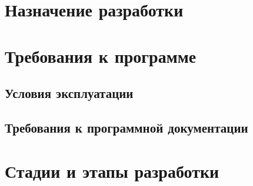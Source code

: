 

\section{Назначение разработки}


\section{Требования к программе}


\subsection{Условия эксплуатации}


\subsection{Требования к программной документации}
\ifsmallfile\else\label{sec:doclist}\fi


\section{Стадии и этапы разработки}
